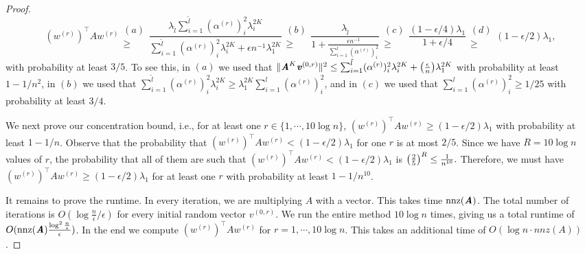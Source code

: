 \documentclass[11pt]{article}
\let\originalleft\left
\let\originalright\right
\renewcommand{\left}{\mathopen{}\mathclose\bgroup\originalleft}
\renewcommand{\right}{\aftergroup\egroup\originalright}
\newcommand\vv{\boldsymbol{\mathit{v}}}
\newcommand\ww{\boldsymbol{\mathit{w}}}
\renewcommand\AA{\boldsymbol{\mathit{A}}}
\begin{document}
\begin{proof}
\[
(\ww^{(r)})^{\top}\AA\ww^{(r)} \substack{(a)\\ \geq}  \frac{\lambda_{\tilde{l}}\sum_{i =1 }^{\tilde{l}}(\alpha^{(r)})^2_i \lambda_i^{2K}}{\sum_{i =1 }^{\tilde{l}}(\alpha^{(r)})^2_i \lambda_i^{2K} + \epsilon n^{-1}\lambda_1^{2K}} \substack{(b)\\ \geq} \frac{\lambda_{\tilde{l}}}{1+\frac{\epsilon n^{-1}}{\sum_{i=1}^l(\alpha^{(r)})_i^2} }\substack{(c)\\ \geq} \frac{(1-\epsilon/4)\lambda_1}{1+\epsilon/4}\substack{(d)\\\geq} (1-\epsilon/2)\lambda_1,
\]
with probability at least $3/5$. To see this, in $(a)$ we used that $\|\AA^K\vv^{(0,r)}\|^2 \leq \sum_{i =1 }^{\tilde{l}}(\alpha^{(r)})_i^2 \lambda_i^{2K}+\left(\frac{\epsilon}{n}\right)\lambda_1^{2K}$ with probability at least $1-1/n^2 $, in $(b)$ we used that $\sum_{i =1 }^{\tilde{l}}(\alpha^{(r)})^2_i \lambda_i^{2K} \geq \lambda_1^{2K}\sum_{i=1}^l (\alpha^{(r)})_i^2$, and in $(c)$ we used that $\sum_{i=1}^l(\alpha^{(r)})_i^2 \geq 1/25$ with probability at least $3/4$.

We next prove our concentration bound, i.e., for at least one $r \in \{1,\cdots, 10\log n\}$, $(\ww^{(r)})^{\top}\AA\ww^{(r)}\geq (1-\epsilon/2)\lambda_1$ with probability at least $1-1/n$. Observe that the probability that $(\ww^{(r)})^{\top}\AA\ww^{(r)}< (1-\epsilon/2)\lambda_1$ for one $r$ is at most $2/5$. Since we have $R = 10\log n$ values of $r$, the probability that all of them are such that $(\ww^{(r)})^{\top}\AA\ww^{(r)}< (1-\epsilon/2)\lambda_1$ is $\left(\frac{2}{5}\right)^{R} \leq \frac{1}{n^{10}}.$
Therefore, we must have $(\ww^{(r)})^{\top}\AA\ww^{(r)}\geq (1-\epsilon/2)\lambda_1$ for at least one $r$ with probability at least $1-1/n^{10}$.

It remains to prove the runtime. In every iteration, we are multiplying $\AA$ with a vector. This takes time $\nnz(\AA)$. The total number of iterations is $O(\log \frac{n}{\epsilon}/\epsilon)$ for every initial random vector $\vv^{(0,r)}$. We run the entire method $10\log n$ times, giving us a total runtime of $O(\nnz(\AA) \frac{\log^2 \frac{n}{\epsilon}}{\epsilon})$. In the end we compute $(\ww^{(r)})^{\top}\AA\ww^{(r)}$ for $r = 1,\cdots, 10\log n$. This takes an additional time of $O(\log n\cdot  nnz(\AA))$.


\end{proof}
\end{document}
